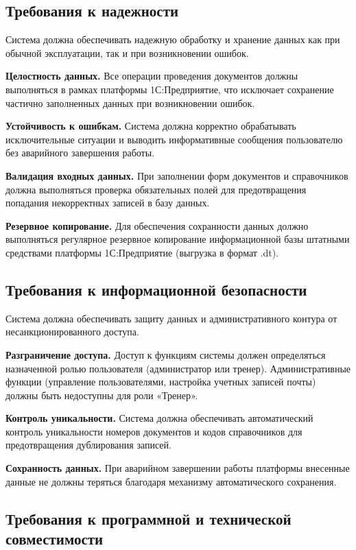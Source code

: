 \subsection{Требования к надежности}

Система должна обеспечивать надежную обработку и хранение данных как при обычной эксплуатации, так и при возникновении ошибок.

\textbf{Целостность данных.} Все операции проведения документов должны выполняться в рамках платформы 1С:Предприятие, что исключает сохранение частично заполненных данных при возникновении ошибок.

\textbf{Устойчивость к ошибкам.} Система должна корректно обрабатывать исключительные ситуации и выводить информативные сообщения пользователю без аварийного завершения работы.

\textbf{Валидация входных данных.} При заполнении форм документов и справочников должна выполняться проверка обязательных полей для предотвращения попадания некорректных записей в базу данных.

\textbf{Резервное копирование.} Для обеспечения сохранности данных должно выполняться регулярное резервное копирование информационной базы штатными средствами платформы 1С:Предприятие (выгрузка в формат .dt).

\subsection{Требования к информационной безопасности}

Система должна обеспечивать защиту данных и административного контура от несанкционированного доступа.

\textbf{Разграничение доступа.} Доступ к функциям системы должен определяться назначенной ролью пользователя (администратор или тренер). Административные функции (управление пользователями, настройка учетных записей почты) должны быть недоступны для роли «Тренер».

\textbf{Контроль уникальности.} Система должна обеспечивать автоматический контроль уникальности номеров документов и кодов справочников для предотвращения дублирования записей.

\textbf{Сохранность данных.} При аварийном завершении работы платформы внесенные данные не должны теряться благодаря механизму автоматического сохранения.

\subsection{Требования к программной и технической совместимости}

